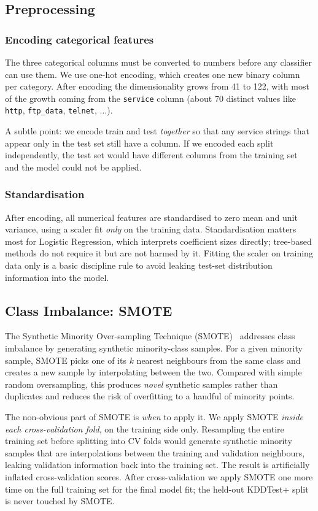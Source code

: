 \documentclass[11pt, a4paper]{article}
\begin{document}
\subsection{Preprocessing}
\subsubsection{Encoding categorical features}
The three categorical columns must be converted to numbers before any classifier can use them. We use one-hot encoding, which creates one new binary column per category. After encoding the dimensionality grows from 41 to 122, with most of the growth coming from the \texttt{service} column (about 70 distinct values like \texttt{http}, \texttt{ftp\_data}, \texttt{telnet}, $\dots$).

A subtle point: we encode train and test \emph{together} so that any service strings that appear only in the test set still have a column. If we encoded each split independently, the test set would have different columns from the training set and the model could not be applied.

\subsubsection{Standardisation}
After encoding, all numerical features are standardised to zero mean and unit variance, using a scaler fit \emph{only} on the training data. Standardisation matters most for Logistic Regression, which interprets coefficient sizes directly; tree-based methods do not require it but are not harmed by it. Fitting the scaler on training data only is a basic discipline rule to avoid leaking test-set distribution information into the model.

\subsection{Class Imbalance: SMOTE}
The Synthetic Minority Over-sampling Technique (SMOTE)~\cite{chawla2002} addresses class imbalance by generating synthetic minority-class samples. For a given minority sample, SMOTE picks one of its $k$ nearest neighbours from the same class and creates a new sample by interpolating between the two. Compared with simple random oversampling, this produces \emph{novel} synthetic samples rather than duplicates and reduces the risk of overfitting to a handful of minority points.

The non-obvious part of SMOTE is \emph{when} to apply it. We apply SMOTE \emph{inside each cross-validation fold}, on the training side only. Resampling the entire training set before splitting into CV folds would generate synthetic minority samples that are interpolations between the training and validation neighbours, leaking validation information back into the training set. The result is artificially inflated cross-validation scores. After cross-validation we apply SMOTE one more time on the full training set for the final model fit; the held-out KDDTest+ split is never touched by SMOTE.
\end{document}
